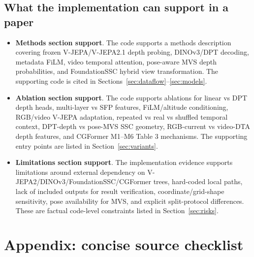 \documentclass[11pt]{article}
\newcommand{\term}[1]{\textbf{#1}}
\begin{document}
\subsection{What the implementation can support in a paper}

\begin{itemize}
  \item \term{Methods section support}.  The code supports a methods description covering frozen V-JEPA/V-JEPA2.1 depth probing, DINOv3/DPT decoding, metadata FiLM, video temporal attention, pose-aware MVS depth probabilities, and FoundationSSC hybrid view transformation.  The supporting code is cited in Sections~\ref{sec:dataflow}--\ref{sec:models}.
  \item \term{Ablation section support}.  The code supports ablations for linear vs DPT depth heads, multi-layer vs SFP features, FiLM/altitude conditioning, RGB/video V-JEPA adaptation, repeated vs real vs shuffled temporal context, DPT-depth vs pose-MVS SSC geometry, RGB-current vs video-DTA depth features, and CGFormer M1--M6 Table 3 mechanisms.  The supporting entry points are listed in Section~\ref{sec:variants}.
  \item \term{Limitations section support}.  The implementation evidence supports limitations around external dependency on V-JEPA2/DINOv3/FoundationSSC/CGFormer trees, hard-coded local paths, lack of included outputs for result verification, coordinate/grid-shape sensitivity, pose availability for MVS, and explicit split-protocol differences.  These are factual code-level constraints listed in Section~\ref{sec:risks}.
\end{itemize}

\section{Appendix: concise source checklist}
\end{document}
